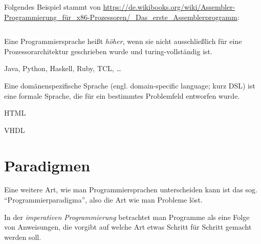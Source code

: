 \begin{beispiel}[Assembler]%
    Folgendes Beispiel stammt von \url{https://de.wikibooks.org/wiki/Assembler-Programmierung_für_x86-Prozessoren/_Das_erste_Assemblerprogramm}:
    \inputminted[linenos, numbersep=5pt, tabsize=4, frame=lines, label=firstp.asm]{nasm}{scripts/assembler/firstp.asm}
\end{beispiel}

\begin{definition}%
    Eine Programmiersprache heißt \textit{höher}, wenn sie nicht ausschließlich
    für eine Prozessorarchitektur geschrieben wurde und turing-vollständig ist.
\end{definition}

\begin{beispiel}
    Java, Python, Haskell, Ruby, TCL, \dots
\end{beispiel}

\begin{definition}%
    Eine domänenspezifische Sprache (engl. domain-specific language; kurz DSL) 
    ist eine formale Sprache, die für ein bestimmtes Problemfeld 
    entworfen wurde.
\end{definition}

\begin{beispiel}
    \begin{bspenum}
        \item HTML
        \item VHDL
    \end{bspenum}
\end{beispiel}

\section{Paradigmen}
Eine weitere Art, wie man Programmiersprachen unterscheiden
kann ist das sog. \enquote{Programmierparadigma}, also die Art wie
man Probleme löst.

\begin{definition}%
    In der \textit{imperativen Programmierung} betrachtet man Programme als
    eine Folge von Anweisungen, die vorgibt auf welche Art etwas 
    Schritt für Schritt gemacht werden soll.
\end{definition}

